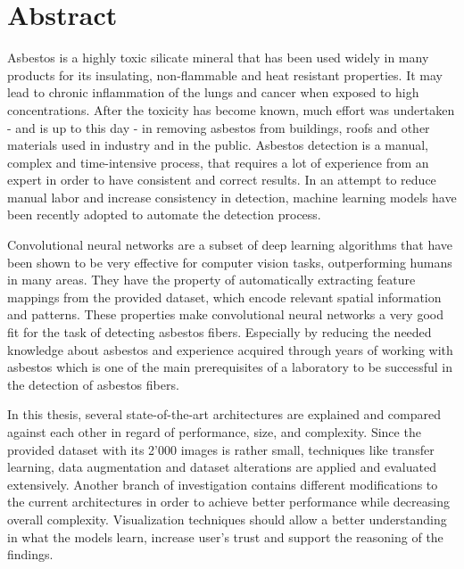 \documentclass[11pt,a4paper,twoside,hidelinks,openright]{rvsmaster}
\begin{document}
\begin{titlepage}
\begin{center}
  \end{center}

\end{titlepage}


\thispagestyle{empty}
\mbox{}

\newpage

\chapter*{Abstract}

Asbestos is a highly toxic silicate mineral that has been used widely in many products for its insulating, non-flammable and heat resistant properties. It may lead to chronic inflammation of the lungs and cancer when exposed to high concentrations. After the toxicity has become known, much effort was undertaken - and is up to this day - in removing asbestos from buildings, roofs and other materials used in industry and in the public. Asbestos detection is a manual, complex and time-intensive process, that requires a lot of experience from an expert in order to have consistent and correct results. In an attempt to reduce manual labor and increase consistency in detection, machine learning models have been recently adopted to automate the detection process.

\vspace{3mm} %

Convolutional neural networks are a subset of deep learning algorithms that have been shown to be very effective for computer vision tasks, outperforming humans in many areas. They have the property of automatically extracting feature mappings from the provided dataset, which encode relevant spatial information and patterns. These properties make convolutional neural networks a very good fit for the task of detecting asbestos fibers. Especially by reducing the needed knowledge about asbestos and experience acquired through years of working with asbestos which is one of the main prerequisites of a laboratory to be successful in the detection of asbestos fibers.

\vspace{3mm} %

In this thesis, several state-of-the-art architectures are explained and compared against each other in regard of performance, size, and complexity. Since the provided dataset with its 2'000 images is rather small, techniques like transfer learning, data augmentation and dataset alterations are applied and evaluated extensively. Another branch of investigation contains different modifications to the current architectures in order to achieve better performance while decreasing overall complexity. Visualization techniques should allow a better understanding in what the models learn, increase user's trust and support the reasoning of the findings.
\end{document}
